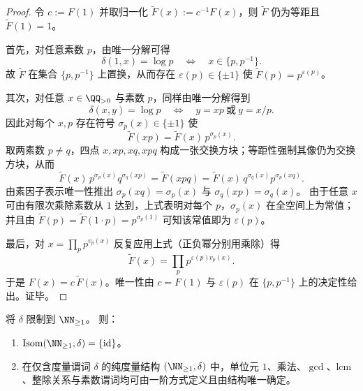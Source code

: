 \begin{proof}
令 \(c:=F(1)\) 并取归一化 \(\widetilde F(x):=c^{-1}F(x)\)，则 \(\widetilde F\) 仍为等距且 \(\widetilde F(1)=1\)。
\par
首先，对任意素数 \(p\)，由唯一分解可得
\[
\delta(1,x)=\log p\quad\Longleftrightarrow\quad x\in\{p,p^{-1}\}.
\]
故 \(\widetilde F\) 在集合 \(\{p,p^{-1}\}\) 上置换，从而存在 \(\varepsilon(p)\in\{\pm 1\}\) 使 \(\widetilde F(p)=p^{\varepsilon(p)}\)。
\par
其次，对任意 \(x\in\QQ_{>0}\) 与素数 \(p\)，同样由唯一分解得到
\[
\delta(x,y)=\log p\quad\Longleftrightarrow\quad y=xp\ \text{或}\ y=x/p.
\]
因此对每个 \(x,p\) 存在符号 \(\sigma_p(x)\in\{\pm 1\}\) 使
\[
\widetilde F(xp)=\widetilde F(x)\,p^{\sigma_p(x)}.
\]
取两素数 \(p\neq q\)，四点 \(x,xp,xq,xpq\) 构成一张交换方块；等距性强制其像仍为交换方块，从而
\[
\widetilde F(x)\,p^{\sigma_p(x)}q^{\sigma_q(xp)}
=\widetilde F(xpq)
=\widetilde F(x)\,q^{\sigma_q(x)}p^{\sigma_p(xq)}.
\]
由素因子表示唯一性推出
\(
\sigma_p(xq)=\sigma_p(x)
\) 与
\(
\sigma_q(xp)=\sigma_q(x)
\)。
由于任意 \(x\) 可由有限次乘除素数从 \(1\) 达到，上式表明对每个 \(p\)，\(\sigma_p(x)\) 在全空间上为常值；并且由
\(
\widetilde F(p)=\widetilde F(1\cdot p)=p^{\sigma_p(1)}
\)
可知该常值即为 \(\varepsilon(p)\)。
\par
最后，对 \(x=\prod_p p^{v_p(x)}\) 反复应用上式（正负幂分别用乘除）得
\[
\widetilde F(x)=\prod_p p^{\varepsilon(p)v_p(x)}.
\]
于是 \(F(x)=c\,\widetilde F(x)\)。唯一性由 \(c=F(1)\) 与 \(\varepsilon(p)\) 在 \(\{p,p^{-1}\}\) 上的决定性给出。证毕。
\end{proof}

\begin{theorem}[\(\NN_{\ge 1}\) 上的绝对刚性与度量可定义算术]\label{thm:conclusion-metric-defines-arithmetic}
将 \(\delta\) 限制到 \(\NN_{\ge 1}\)。
则：
\begin{enumerate}
  \item \(\operatorname{Isom}(\NN_{\ge 1},\delta)=\{\mathrm{id}\}\)。
  \item 在仅含度量谓词 \(\delta\) 的纯度量结构 \((\NN_{\ge 1},\delta)\) 中，单位元 \(1\)、乘法、\(\gcd\)、\(\mathrm{lcm}\)、整除关系与素数谓词均可由一阶方式定义且由结构唯一确定。
\end{enumerate}
\end{theorem}

